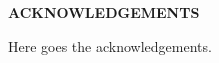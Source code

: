 
\begin{center}
\vspace*{52pt}
{\Large \textbf{ACKNOWLEDGEMENTS}}
\end{center}


Here goes the acknowledgements.


\clearpage 

